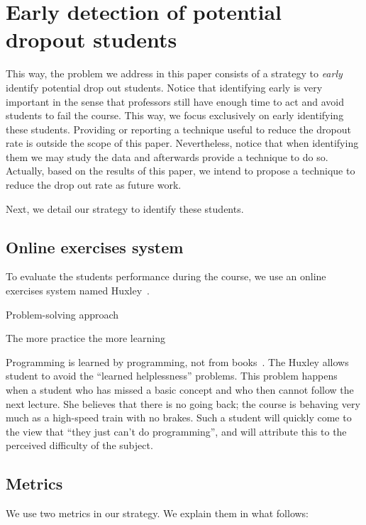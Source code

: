 \section{Early detection of potential dropout students}

\label{sec:strategy}

This way, the problem we address in this paper consists of a strategy to \textit{early} identify potential drop out students. Notice that identifying early is very important in the sense that professors still have enough time to act and avoid students to fail the course. This way, we focus exclusively on early identifying these students. Providing or reporting a technique useful to reduce the dropout rate is outside the scope of this paper. Nevertheless, notice that when identifying them we may study the data and afterwards provide a technique to do so. Actually, based on the results of this paper, we intend to propose a technique to reduce the drop out rate as future work.

Next, we detail our strategy to identify these students.

\subsection{Online exercises system}

To evaluate the students performance during the course, we use an online exercises system named Huxley~\cite{}. 

Problem-solving approach

The more practice the more learning

Programming is learned by programming, not from books~\cite{}.
The Huxley allows student to avoid the ``learned helplessness'' problems. This problem happens when a student who has missed a basic concept and who then cannot follow the next lecture. She believes that there is no going back; the course is behaving very much as a high-speed train with no brakes. Such a student will quickly come to the view that ``they just can't do programming'', and will attribute this to the perceived difficulty of the subject.

\subsection{Metrics}

\label{sec:metrics}

We use two metrics in our strategy. We explain them in what follows:

